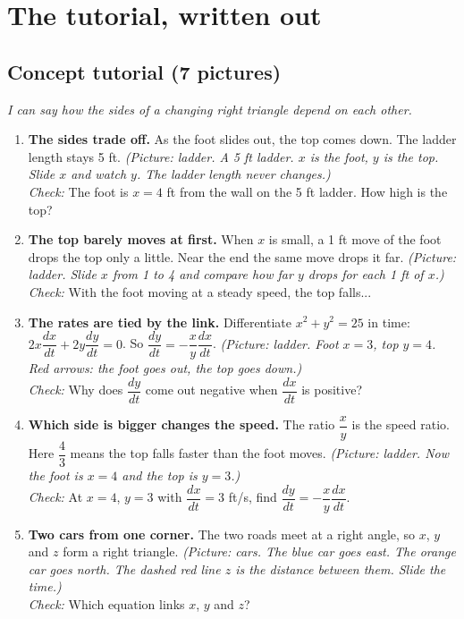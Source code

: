 \documentclass[11pt]{article}
\begin{document}
\section*{The tutorial, written out}
\subsection*{Concept tutorial (7 pictures)}
\textit{I can say how the sides of a changing right triangle depend on each other.}\par
\begin{enumerate}
\item \textbf{The sides trade off.} As the foot slides out, the top comes down. The ladder length stays 5 ft. \textit{(Picture: ladder. A 5 ft ladder. $x$ is the foot, $y$ is the top. Slide $x$ and watch $y$. The ladder length never changes.)}\\ \textit{Check:} The foot is $x=4$ ft from the wall on the 5 ft ladder. How high is the top? 
\item \textbf{The top barely moves at first.} When $x$ is small, a 1 ft move of the foot drops the top only a little. Near the end the same move drops it far. \textit{(Picture: ladder. Slide $x$ from 1 to 4 and compare how far $y$ drops for each 1 ft of $x$.)}\\ \textit{Check:} With the foot moving at a steady speed, the top falls... 
\item \textbf{The rates are tied by the link.} Differentiate $x^2+y^2=25$ in time: $2x\dfrac{dx}{dt}+2y\dfrac{dy}{dt}=0$. So $\dfrac{dy}{dt}=-\dfrac{x}{y}\dfrac{dx}{dt}$. \textit{(Picture: ladder. Foot $x=3$, top $y=4$. Red arrows: the foot goes out, the top goes down.)}\\ \textit{Check:} Why does $\dfrac{dy}{dt}$ come out negative when $\dfrac{dx}{dt}$ is positive? 
\item \textbf{Which side is bigger changes the speed.} The ratio $\dfrac{x}{y}$ is the speed ratio. Here $\dfrac43$ means the top falls faster than the foot moves. \textit{(Picture: ladder. Now the foot is $x=4$ and the top is $y=3$.)}\\ \textit{Check:} At $x=4$, $y=3$ with $\dfrac{dx}{dt}=3$ ft/s, find $\dfrac{dy}{dt}=-\dfrac{x}{y}\dfrac{dx}{dt}$. 
\item \textbf{Two cars from one corner.} The two roads meet at a right angle, so $x$, $y$ and $z$ form a right triangle. \textit{(Picture: cars. The blue car goes east. The orange car goes north. The dashed red line $z$ is the distance between them. Slide the time.)}\\ \textit{Check:} Which equation links $x$, $y$ and $z$? 

\end{enumerate}
\end{document}
